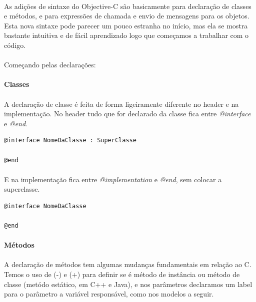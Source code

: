 \documentclass[a4paper,12pt,brazil,doubleside]{book}
\begin{document}
\paragraph{}As adições de sintaxe do Objective-C são basicamente para declaração de classes e métodos, e para expressões de chamada e envio de mensagens para os objetos. Esta nova sintaxe pode parecer um pouco estranha no início, mas ela se mostra bastante intuitiva e de fácil aprendizado logo que começamos a trabalhar com o código.
\paragraph{}Começando pelas declarações:

\bigskip 

\paragraph{}\textbf{Classes}

\paragraph{}A declaração de classe é feita de forma ligeiramente diferente no header e na implementação. No header tudo que for declarado da classe fica entre \textit{@interface} e \textit{@end}.

\begin{lstlisting}
@interface NomeDaClasse : SuperClasse

@end
\end{lstlisting}

\paragraph{}E na implementação fica entre \textit{@implementation
} e \textit{@end}, sem colocar a superclasse.

\begin{lstlisting}
@interface NomeDaClasse

@end
\end{lstlisting}

\bigskip 

\paragraph{}\textbf{Métodos}

\paragraph{}A declaração de métodos tem algumas mudanças fundamentais em relação ao C. Temos o uso de (-) e (+) para definir se é método de instância ou método de classe (metódo estático, em C++ e Java), e nos parâmetros declaramos um label para o parâmetro a variável responsável, como nos modelos a seguir.\\
\end{document}
